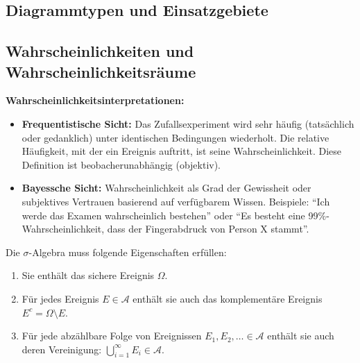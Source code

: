 \subsection{Diagrammtypen und Einsatzgebiete}
\newpage

\subsection{Wahrscheinlichkeiten und Wahrscheinlichkeitsräume}


\textbf{Wahrscheinlichkeitsinterpretationen:}
\begin{itemize}[leftmargin=1.5em]
    \item \textbf{Frequentistische Sicht:} Das Zufallsexperiment wird sehr häufig (tatsächlich oder gedanklich) unter identischen Bedingungen wiederholt. Die relative Häufigkeit, mit der ein Ereignis auftritt, ist seine Wahrscheinlichkeit. Diese Definition ist beobacherunabhängig (objektiv).
    \item \textbf{Bayessche Sicht:} Wahrscheinlichkeit als Grad der Gewissheit oder subjektives Vertrauen basierend auf verfügbarem Wissen. Beispiele: ``Ich werde das Examen wahrscheinlich bestehen'' oder ``Es besteht eine 99\%-Wahrscheinlichkeit, dass der Fingerabdruck von Person X stammt''.
\end{itemize}



Die $\sigma$-Algebra muss folgende Eigenschaften erfüllen:
\begin{enumerate}[leftmargin=1.5em]
    \item Sie enthält das sichere Ereignis $\Omega$.
    \item Für jedes Ereignis $E \in \mathcal{A}$ enthält sie auch das komplementäre Ereignis $E^c = \Omega \setminus E$.
    \item Für jede abzählbare Folge von Ereignissen $E_1, E_2, \ldots \in \mathcal{A}$ enthält sie auch deren Vereinigung: $\bigcup_{i=1}^\infty E_i \in \mathcal{A}$.
\end{enumerate}

